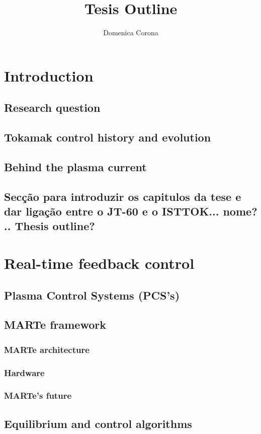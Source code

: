 \documentclass{article}
\title{Tesis Outline}
\author{Domenica Corona }
\begin{document}
\maketitle

\section{Introduction}
\subsection{Research question}
\subsection{Tokamak control history and evolution}
\subsection{Behind the plasma current}
\subsection{Secç\~ao para introduzir os capitulos da tese e dar ligaç\~ao entre o JT-60 e o ISTTOK... nome? .. Thesis outline?}
\hfil

\section{Real-time feedback control}
\subsection{Plasma Control Systems (PCS's)}
\subsection{MARTe framework}
\subsubsection{MARTe architecture }
\subsubsection{Hardware}
\subsubsection{MARTe's future}
\subsection{Equilibrium and control algorithms} 
\end{document}
